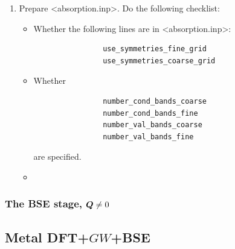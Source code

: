 \documentclass[hyperref, a4paper, 12pt]{report}
\def\texttt#1{<#1>}%
\newcommand{\shortcode}[1]{\texttt{#1}}
\begin{document}
\begin{enumerate}
\begin{enumerate}
        \item Prepare \shortcode{absorption.inp}. Do the following checklist:
        \begin{itemize}
            \item Whether the following lines are in \shortcode{absorption.inp}:
            \begin{lstlisting}
                use_symmetries_fine_grid
                use_symmetries_coarse_grid
            \end{lstlisting}
            \item Whether 
            \begin{lstlisting}
                number_cond_bands_coarse
                number_cond_bands_fine
                number_val_bands_coarse
                number_val_bands_fine
            \end{lstlisting}
            are specified.
            \item 
        \end{itemize}
    \end{enumerate}
\end{enumerate}

\subsubsection{The BSE stage, $\vb*{Q} \neq 0$}



\subsection{Metal DFT+$GW$+BSE}\label{sec:metal-sop}
\end{document}
